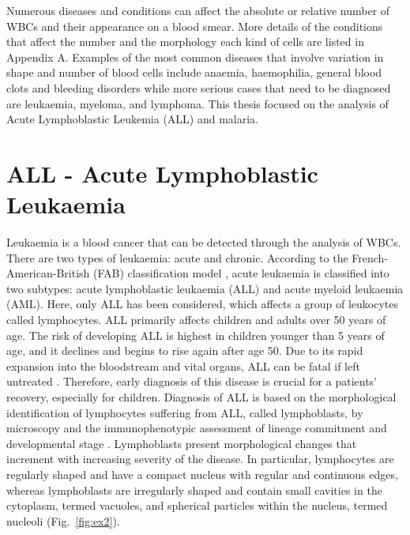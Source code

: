 \documentclass[final,a4paper,12pt,english]{UnicaPhdThesis3}
\begin{document}
Numerous diseases and conditions can affect the absolute or relative number of WBCs and their appearance on a blood smear. More details of the conditions that affect the number and the morphology each kind of cells are listed in Appendix A. Examples of the most common diseases that involve variation in shape and number of blood cells include anaemia, haemophilia, general blood clots and bleeding disorders while more serious cases that need to be diagnosed are leukaemia, myeloma, and lymphoma. This thesis focused on the analysis of Acute Lymphoblastic Leukemia (ALL) and malaria.

\section{ALL - Acute Lymphoblastic Leukaemia}
Leukaemia is a blood cancer that can be detected through the analysis of WBCs. There are two types of leukaemia: acute and chronic. According to the French-American-British (FAB) classification model \cite{Bennett}, acute leukaemia is classified into two subtypes: acute lymphoblastic leukaemia (\acs{ALL}) and acute myeloid leukaemia (AML). Here, only ALL has been considered, which affects a group of leukocytes called lymphocytes. ALL primarily affects children and adults over 50 years of age. The risk of developing ALL is highest in children younger than 5 years of age, and it declines and begins to rise again after age 50. Due to its rapid expansion into the bloodstream and vital organs, ALL can be fatal if left untreated \cite{Biondi}. Therefore, early diagnosis of this disease is crucial for a patients' recovery, especially for children. Diagnosis of ALL is based on the morphological identification of lymphocytes suffering from ALL, called lymphoblasts, by microscopy and the immunophenotypic assessment of lineage commitment and developmental stage \cite{Inaba}. Lymphoblasts present morphological changes that increment with increasing severity of the disease. In particular, lymphocytes are regularly shaped and have a compact nucleus with regular and continuous edges, whereas lymphoblasts are irregularly shaped and contain small cavities in the cytoplasm, termed vacuoles, and spherical particles within the nucleus, termed nucleoli \cite{Donida} (Fig.~\ref{fig:ex2}).
\end{document}
